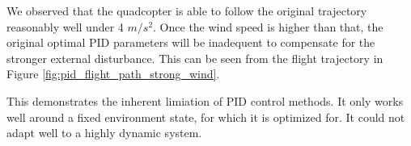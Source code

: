 \documentclass[12pt]{article}
\begin{document}

We observed that the quadcopter is able to follow the original trajectory reasonably well under 4 $m/s^2$. Once the wind speed is higher than that,
the original optimal PID parameters will be inadequent to compensate for the stronger external disturbance. This can be seen from the flight trajectory in Figure \ref{fig:pid_flight_path_strong_wind}.

This demonstrates the inherent limiation of PID control methods. It only works well around a fixed environment state, for which it is optimized for.
It could not adapt well to a highly dynamic system.
\end{document}
